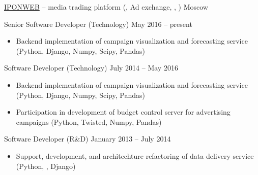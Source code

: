 \documentclass[unicode, 10pt, a4paper, oneside, fleqn]{article}
\begin{document}
\job  %
    {\href{http://www.iponweb.com}{IPONWEB} -- media trading platform
     (, Ad exchange, , )}
    {Moscow}
    {
        \position  %
            {Senior Software Developer (Technology)}
            {May 2016 -- present}
            {
                \begin{itemize}
                    \item{Backend implementation of campaign visualization and
                          forecasting service (Python, Django, Numpy, Scipy, Pandas)}
                \end{itemize}
            }
        \position  %
            {Software Developer (Technology)}
            {July 2014 -- May 2016}
            {
                \begin{itemize}
                    \item{Backend implementation of campaign visualization and
                          forecasting service (Python, Django, Numpy, Scipy, Pandas)}
                    \item{Participation in development of budget control server for
                          advertising campaigns (Python, Twisted, Numpy, Pandas)}
                \end{itemize}
            }
        \position  %
            {Software Developer (R\&D)}
            {January 2013 -- July 2014}
            {
                \begin{itemize}
                    \item{Support, development, and architechture refactoring
                          of data delivery service (Python, , Django)}
                \end{itemize}
            }
    }
\end{document}
